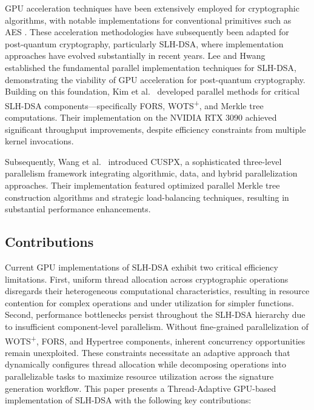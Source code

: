 \documentclass[journal]{IEEEtran}
\begin{document}
GPU acceleration techniques have been extensively employed for cryptographic algorithms, with notable implementations for conventional primitives such as AES \cite{Lee2022a}. These acceleration methodologies have subsequently been adapted for post-quantum cryptography, particularly SLH-DSA, where implementation approaches have evolved substantially in recent years.
Lee and Hwang~\cite{Lee2022} established the fundamental parallel implementation techniques for SLH-DSA, demonstrating the viability of GPU acceleration for post-quantum cryptography. Building on this foundation, Kim et al.~\cite{Kim2024} developed parallel methods for critical SLH-DSA components—specifically FORS, WOTS\textsuperscript{+}, and Merkle tree computations. Their implementation on the NVIDIA RTX 3090 achieved significant throughput improvements, despite efficiency constraints from multiple kernel invocations.

Subsequently, Wang et al.~\cite{Wang2025} introduced CUSPX, a sophisticated three-level parallelism framework integrating algorithmic, data, and hybrid parallelization approaches. Their implementation featured optimized parallel Merkle tree construction algorithms and strategic load-balancing techniques, resulting in substantial performance enhancements.


\subsection{Contributions}

Current GPU implementations of SLH-DSA exhibit two critical efficiency limitations. 
First, uniform thread allocation across cryptographic operations disregards their heterogeneous computational characteristics, resulting in resource contention for complex operations and under utilization for simpler functions. 
Second, performance bottlenecks persist throughout the SLH-DSA hierarchy due to insufficient component-level parallelism. 
Without fine-grained parallelization of WOTS\textsuperscript{+}, FORS, and Hypertree components, inherent concurrency opportunities remain unexploited. 
These constraints necessitate an adaptive approach that dynamically configures thread allocation while decomposing operations into parallelizable tasks to maximize resource utilization across the signature generation workflow.
This paper presents a Thread-Adaptive GPU-based implementation of SLH-DSA with the following key contributions:
\end{document}
